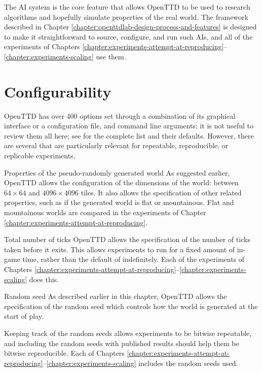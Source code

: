 \documentclass[logo,msc,dsti]{style/infthesis}    %
\begin{document}
{The AI system is the core feature that allows OpenTTD to be used to research algorithms and hopefully simulate properties of the real world. The framework described in Chapter \ref{chapter:openttdlab-design-process-and-features} is designed to make it straightforward to source, configure, and run such AIs, and all of the experiments of Chapters \ref{chapter:experiments-attempt-at-reproducing}--\ref{chapter:experiments-scaling} use them.

\section{Configurability}

OpenTTD has over 400 options set through a combination of its graphical interface or a configuration file, and command line arguments; it is not useful to review them all here; see \cite{OpenTTDWiki} for the complete list and their defaults. However, there are several that are particularly relevant for repeatable, reproducible, or replicable experiments.

\begin{itemize}
\begin{descitem}{Properties of the pseudo-randomly generated world}
As suggested earlier, OpenTTD allows the configuration of the dimensions of the world: between $64 \times 64$ and $4096 \times 4096$ tiles. It also allows the specification of other related properties, such as if the generated world is flat or mountainous. Flat and mountainous worlds are compared in the experiments of Chapter \ref{chapter:experiments-attempt-at-reproducing}.
\end{descitem}
\begin{descitem}{Total number of ticks}
OpenTTD allows the specification of the number of ticks taken before it exits. This allows experiments to run for a fixed amount of in-game time, rather than the default of indefinitely. Each of the experiments of Chapters \ref{chapter:experiments-attempt-at-reproducing}--\ref{chapter:experiments-scaling} does this.
\end{descitem}
\begin{descitem}{Random seed}
As described earlier in this chapter, OpenTTD allows the specification of the random seed which controls how the world is generated at the start of play.

Keeping track of the random seeds allows experiments to be bitwise repeatable, and including the random seeds with published results should help them be bitwise reproducible. Each of Chapters \ref{chapter:experiments-attempt-at-reproducing}--\ref{chapter:experiments-scaling} includes the random seeds used.
\end{descitem}


\end{itemize}}
\end{document}
